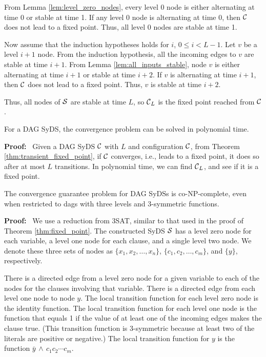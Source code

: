 From Lemma \ref{lem:level_zero_nodes}, every level 0 node is either
alternating at time 0 or stable at time 1.  If any level 0 node is
alternating at time 0, then $\mbox{$\mathcal{C}$}$ does not lead to a fixed point.
Thus, all level 0 nodes are stable at time 1.

Now assume that the induction hypotheses holds for $i$, $0 \leq i
< L-1$.  Let $v$ be a level $i+1$ node.  From the induction hypothesis,
all the incoming edges to $v$ are stable at time $i+1$.  From Lemma
\ref{lem:all_inputs_stable}, node $v$ is either alternating at time
$i+1$ or stable at time $i+2$.  If $v$ is alternating at time $i+1$,
then $\mbox{$\mathcal{C}$}$ does not lead to a fixed point.  Thus, $v$ is stable
at time $i+2$.

Thus, all nodes of $\mbox{$\mathcal{S}$}$ are stable at time $L$,
so  $\mbox{$\mathcal{C}$}_L$ is the fixed point reached from $\mbox{$\mathcal{C}$}$.
\QED
\fi

\iffalse

\begin{corollary}\label{cor:convergence}
For a DAG SyDS, the convergence problem can be solved in polynomial time.
\end{corollary}
\noindent
\textbf{Proof:}~ Given a DAG SyDS $\mbox{$\mathcal{C}$}$ with $L$ and configuration $\mbox{$\mathcal{C}$}$,
from Theorem \ref{thm:transient_fixed_point},
if $\mbox{$\mathcal{C}$}$ converges, i.e., leads to a fixed point,
it does so after at most $L$ transitions.
In polynomial time, we can find $\mbox{$\mathcal{C}$}_L$, and see if it is a fixed point.
\QED

\begin{theorem}\label{thm:convergence_guaranee}
The convergence guarantee problem for DAG SyDSs is co-NP-complete,
even when restricted to dags with  three levels and 3-symmetric functions.
\end{theorem}
\noindent
\textbf{Proof:}~ 
We use a reduction from 3SAT, similar to that used in the proof of Theorem \ref{thm:fixed_point}.
The constructed SyDS $\mbox{$\mathcal{S}$}$ has a level zero node for each variable, 
a level one node for each clause, and a single level two node.
We denote these three sets of nodes as $\{x_1, x_2, \ldots , x_n\}$,
$\{c_1,c_2, \ldots , c_m\}$, and $\{y\}$, respectively.

There is a directed edge from a  level zero node for a given variable 
to each of  the nodes for the clauses involving that variable.
There is a directed edge from each level one node to node $y$.
The local transition function for each level zero node is the identity function.
The local transition function for each level one node is the function that equals 1
 if the value of at least one of the incoming edges
makes the clause true. 
(This transition function is 3-symmetric because at least two of the literals are positive or negative.)
The local transition function for $y$ is the function $\bar{y} \, \wedge \, c_1 c_2 \cdots  c_{m}$.

